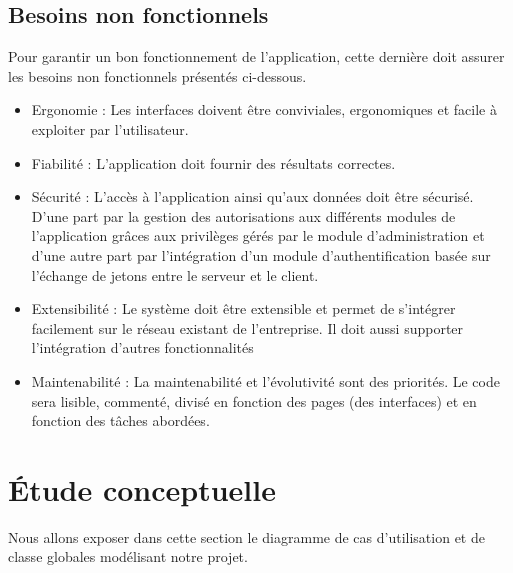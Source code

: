 \subsection{Besoins non fonctionnels}
Pour garantir un bon fonctionnement de l'application, cette dernière doit assurer les besoins non fonctionnels présentés ci-dessous.
\begin{itemize}
	\item Ergonomie : Les interfaces doivent être conviviales, ergonomiques et facile à exploiter par l'utilisateur.
	\item Fiabilité : L'application doit fournir des résultats correctes.
	\item Sécurité : L'accès à l'application ainsi qu'aux données doit être sécurisé. D'une part par
	la gestion des autorisations aux différents modules de l'application grâces aux privilèges
	gérés par le module d'administration et d'une autre part par l'intégration d'un module
	d'authentification basée sur l'échange de jetons  entre le serveur et le client.
	\item Extensibilité : Le système doit être extensible et permet de s'intégrer facilement sur le réseau existant  de l'entreprise. Il doit aussi supporter l'intégration d'autres fonctionnalités
	\item  Maintenabilité : La maintenabilité et l'évolutivité sont des priorités. Le code sera lisible,
	commenté, divisé en fonction des pages (des interfaces) et en fonction des tâches abordées.

\end{itemize}
\section{Étude conceptuelle}

Nous allons exposer dans cette section le diagramme de cas d'utilisation et de classe globales modélisant notre projet.

